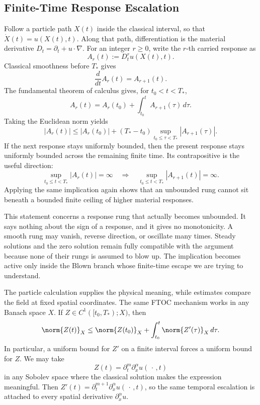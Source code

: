 
\subsection{Finite-Time Response Escalation}\label{sub:FiniteTimeResponseEscalation}

Follow a particle path \(X(t)\) inside the classical interval, so that \(\dot X(t)=u(X(t),t)\).
Along that path, differentiation is the material derivative \(D_t=\partial_t+u\cdot\nabla\).
For an integer \(r\geq0\), write the \(r\)-th carried response as
\[
  A_r(t)
  :=
  D_t^r u(X(t),t).
\]
Classical smoothness before \(T_*\) gives
\[
  \frac{d}{dt}A_r(t)=A_{r+1}(t).
\]
The fundamental theorem of calculus gives, for \(t_0<t<T_*\),
\[
  A_r(t)
  =
  A_r(t_0)
  +
  \int_{t_0}^{t}A_{r+1}(\tau)\,d\tau.
\]
Taking the Euclidean norm yields
\[
  |A_r(t)|
  \leq
  |A_r(t_0)|
  +(T_*-t_0)
  \sup_{t_0\leq\tau<T_*}|A_{r+1}(\tau)|.
\]
If the next response stays uniformly bounded, then the present response stays uniformly bounded across the remaining finite time.
Its contrapositive is the useful direction:
\[
  \sup_{t_0\leq t<T_*}|A_r(t)|=\infty
  \quad\Longrightarrow\quad
  \sup_{t_0\leq t<T_*}|A_{r+1}(t)|=\infty.
\]
Applying the same implication again shows that an unbounded rung cannot sit beneath a bounded finite ceiling of higher material responses.

This statement concerns a response rung that actually becomes unbounded.
It says nothing about the sign of a response, and it gives no monotonicity.
A smooth rung may vanish, reverse direction, or oscillate many times.
Steady solutions and the zero solution remain fully compatible with the argument because none of their rungs is assumed to blow up.
The implication becomes active only inside the Blown branch whose finite-time escape we are trying to understand.

The particle calculation supplies the physical meaning, while estimates compare the field at fixed spatial coordinates.
The same FTOC mechanism works in any Banach space \(X\).
If \(Z\in C^1([t_0,T_*);X)\), then
\[
  \norm{Z(t)}_X
  \leq
  \norm{Z(t_0)}_X
  +
  \int_{t_0}^{t}\norm{Z'(\tau)}_X\,d\tau.
\]
In particular, a uniform bound for \(Z'\) on a finite interval forces a uniform bound for \(Z\).
We may take
\[
  Z(t)
  =
  \partial_t^m\partial_x^\alpha u(\,\cdot\,,t)
\]
in any Sobolev space where the classical solution makes the expression meaningful.
Then \(Z'(t)=\partial_t^{m+1}\partial_x^\alpha u(\,\cdot\,,t)\), so the same temporal escalation is attached to every spatial derivative \(\partial_x^\alpha u\).

